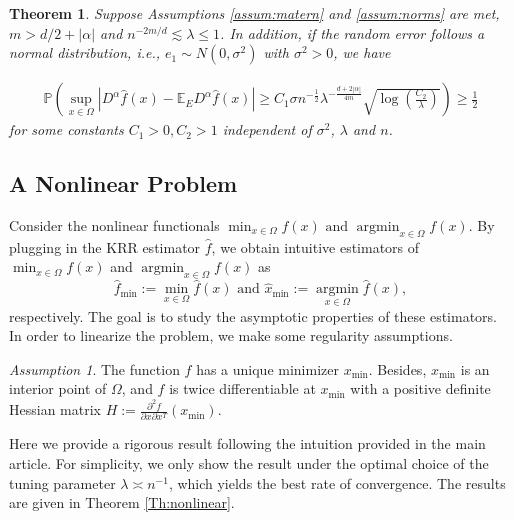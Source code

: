 \documentclass[12pt]{article}
\theoremstyle{plain}
\newtheorem{theorem}{Theorem}
\theoremstyle{remark}
\newtheorem{assumption}{Assumption}
\begin{document}
\begin{theorem}\label{Th:uniformlower}
    Suppose Assumptions \ref{assum:matern} and \ref{assum:norms} are met, $m>d/2+|\alpha|$ and $n^{-2m/d}\lesssim\lambda\leq 1$.
    In addition, if the random error follows a normal distribution, i.e., $e_1\sim N(0,\sigma^2)$ with $\sigma^2>0$, we have
   
    \begin{eqnarray*}
        \mathbb{P}\left(\sup_{x\in\Omega}\left|D^\alpha \hat{f}(x)-\mathbb{E}_E D^\alpha \hat{f}(x)\right|\geq C_1\sigma n^{-\frac{1}{2}}\lambda^{-\frac{d+2|\alpha|}{4m}}\sqrt{\log\left(\frac{C_2}{\lambda}\right)}\right)\geq \frac{1}{2}
    \end{eqnarray*}
    for some constants $C_1>0,C_2>1$ independent of $\sigma^2$, $\lambda$ and $n$.
\end{theorem}



\subsection{A Nonlinear Problem}\label{sec:nonlinearSup}
Consider the nonlinear functionals
$\min_{x\in\Omega} f(x) \text{ and } \operatorname*{argmin}_{x\in\Omega}f(x)$.
By plugging in the KRR estimator $\hat{f}$, we obtain intuitive estimators of $\min_{x\in\Omega} f(x)$ and $\operatorname*{argmin}_{x\in\Omega}f(x)$ as 
\[\hat{f}_{\min}:=\min_{x\in\Omega} \hat{f}(x) \text{ and } \hat{x}_{\min}:=\operatorname*{argmin}_{x\in\Omega}\hat{f}(x),\]
respectively. The goal is to study the asymptotic properties of these estimators. In order to linearize the problem, we make some regularity assumptions.

\begin{assumption}\label{assum:nonlinear}
    The function $f$ has a unique minimizer $x_{\min}$. %
    Besides, $x_{\min}$ is an interior point of $\Omega$, and $f$ is twice differentiable at $x_{\min}$ with a positive definite Hessian matrix $H:=\frac{\partial^2 f}{\partial x\partial x^T}(x_{\min})$.
\end{assumption}

Here we provide a rigorous result following the intuition provided in the main article. For simplicity, we only show the result under the optimal choice of the tuning parameter $\lambda\asymp n^{-1}$, which yields the best rate of convergence. The results are given in Theorem \ref{Th:nonlinear}.
\end{document}
